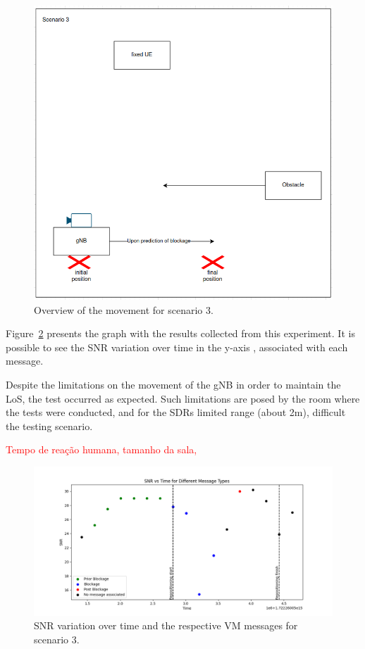 \begin{figure}[H]
    \centering
    \includegraphics[width=0.5\linewidth]{figures/scenario3}
    \caption{Overview of the movement for scenario 3.}
    \label{fig:test_movgnb}
\end{figure}

Figure~\ref{fig:results_3} presents the graph with the results collected from this experiment.
It is possible to see the SNR variation over time in the y-axis , associated with each message.

Despite the limitations on the movement of the gNB in order to maintain the LoS, the test occurred as expected.
Such limitations are posed by the room where the tests were conducted, and for the SDRs limited range (about 2m), difficult the testing scenario.

\textcolor{red}{Tempo de reação humana, tamanho da sala, }


\begin{figure}[H]
    \centering
    \includegraphics[width=\linewidth]{figures/results_3}
    \caption{SNR variation over time and the respective VM messages for scenario 3.}
    \label{fig:results_3}
\end{figure}


